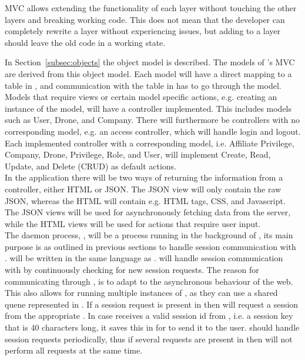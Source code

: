 
MVC allows extending the functionality of each layer without touching the other layers and breaking working code.
This does not mean that the developer can completely rewrite a layer without experiencing issues, but adding to a layer should leave the old code in a working state.

In Section~\ref{subsec:objects} the object model is described.
The models of 's MVC are derived from this object model.
Each model will have a direct mapping to a table in , and communication with the table in  has to go through the model. \\

Models that require views or certain model specific actions, e.g. creating an instance of the model, will have a controller implemented.
This includes models such as User, Drone, and Company.
There will furthermore be controllers with no corresponding model, e.g. an access controller, which will handle login and logout.
Each implemented controller with a corresponding model, i.e. Affiliate Privilege, Company, Drone, Privilege, Role, and User, will implement Create, Read, Update, and Delete (CRUD) as default actions. \\

In the application there will be two ways of returning the information from a controller, either HTML or JSON.
The JSON view will only contain the raw JSON, whereas the HTML will contain e.g. HTML tags, CSS, and Javascript.
The JSON views will be used for asynchronously fetching data from the server, while the HTML views will be used for actions that require user input. \\

The daemon process, , will be a process running in the background of , its main purpose is as outlined in previous sections to handle session communication with .
 will be written in the same language as . %
 will handle session communication with  by continuously checking  for new session requests.
The reason for communicating through , is to adapt to the asynchronous behaviour of the web.
This also allows for running multiple instances of , as they can use a shared quene represented in .
If a session request is present in  then  will request a session from the appropriate .
In case  receives a valid session id from , i.e. a session key that is 40 characters long, it saves this in  for  to send it to the user.
 should handle session requests periodically, thus if several requests are present in  then  will not perform all requests at the same time. \\

